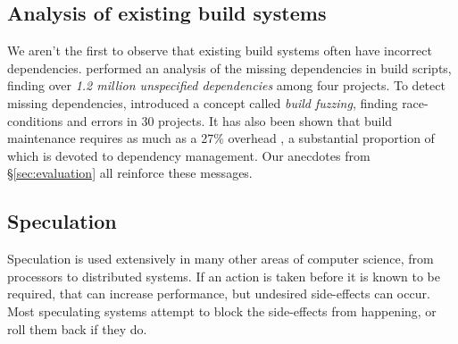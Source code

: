 %

\subsection{Analysis of existing build systems}

We aren't the first to observe that existing build systems often have incorrect dependencies.  \citet{bezemer2017empirical} performed an analysis of the missing dependencies in \Make build scripts, finding over \emph{1.2 million unspecified dependencies} among four projects. To detect missing dependencies, \citet{detecting_incorrect_build_rules} introduced a concept called \emph{build fuzzing}, finding race-conditions and errors in 30 projects. It has also been shown that build maintenance requires as much as a 27\% overhead \cite{build_maintenance}, a substantial proportion of which is devoted to dependency management. Our anecdotes from \S\ref{sec:evaluation} all reinforce these messages.

\subsection{Speculation}

Speculation is used extensively in many other areas of computer science, from processors to distributed systems. If an action is taken before it is known to be required, that can increase performance, but undesired side-effects can occur. Most speculating systems attempt to block the side-effects from happening, or roll them back if they do.

